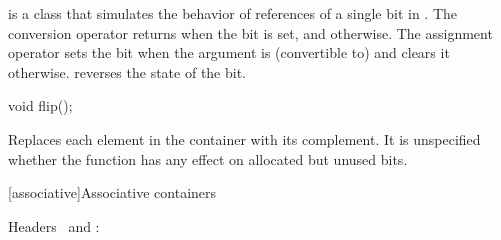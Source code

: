 \documentclass[american,twoside]{book}
\begin{document}
\pnum
{}
is a class that simulates the behavior of references of a single bit in
. The conversion operator returns 
when the bit is set, and  otherwise. The assignment operator
sets the bit when the argument is (convertible to)  and
clears it otherwise.  reverses the state of the bit.

\begin{itemdecl}
void flip();
\end{itemdecl}

\begin{itemdescr}
\pnum
\effects Replaces each element in the container with its complement.
It is unspecified whether the function has any effect on allocated but unused bits.
\end{itemdescr}

[associative]{Associative containers}

\pnum
Headers \ and :

%
\end{document}
